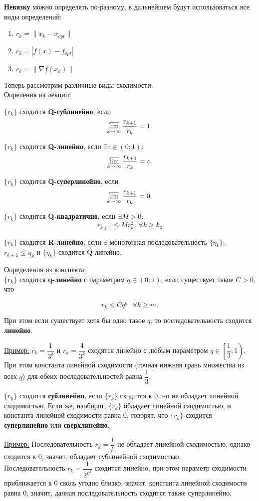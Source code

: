 \textbf{Невязку} можно определять по-разному, в дальнейшем будут использоваться все виды определений:
\begin{enumerate}
    \item $r_k = \|x_k - x_{opt}\|$
    \item $r_k = |f(x) - f_{opt}|$
    \item $r_k = \|\nabla f(x_k)\|$
\end{enumerate}
Теперь рассмотрим различные виды сходимости. \\
Опреления из лекции:

$\{r_k\}$ сходится \textbf{Q-сублинейно}, если \[\varlimsup\limits_{k\to\infty} \dfrac{r_{k+1}}{r_k} = 1.\]

$\{r_k\}$ сходится \textbf{Q-линейно}, если $\exists c\in(0; 1): $
\[\varlimsup\limits_{k\to\infty} \dfrac{r_{k+1}}{r_k} = c.\]

$\{r_k\}$ сходится \textbf{Q-суперлинейно}, если \[\varlimsup\limits_{k\to\infty} \dfrac{r_{k+1}}{r_k} = 0.\]


$\{r_k\}$ сходится \textbf{Q-квадратично}, если $\exists M>0:$ \[r_{k+1} \leq M r_k^2\ \ \ \forall k \geq k_0\]

$\{r_k\}$ сходится \textbf{R-линейно}, если $\exists$ монотонная последовательность $\{\eta_k\}$: $r_{k+1} \leq \eta_k$ и $\{\eta_k\}$ сходится Q-линейно.
\bigskip

Определения из конспекта:\\
$\{r_k\}$ сходится \textbf{q-линейно} с параметром $q\in (0; 1)$, если существует такое $C > 0$, что

\[r_k \leq Cq^k\ \ \ \forall k \geq m.\]

При этом если существует хотя бы одно такое $q$, то последовательность сходится \textbf{линейно}.

\underline{Пример:} $r_k = \dfrac{1}{3^k}$ и $r_k = \dfrac{4}{3^k}$ сходятся линейно с любым параметром $q \in \left[\dfrac{1}{3}; 1\right)$. При этом константа линейной сходимости (точная нижняя грань множества из всех $q$) для обеих последовательностей равна $\dfrac{1}{3}$.

$\{r_k\}$ сходится \textbf{сублинейно}, если $\{r_k\}$ сходится к 0, но не обладает линейной сходимостью. Если же, наоборот, $\{r_k\}$ обладает линейной сходимостью, и константа линейной сходимости равна 0, говорят, что $\{r_k\}$ сходится \textbf{суперлинейно} или \textbf{сверхлинейно}.

\underline{Пример:} Последовательность $r_k = \dfrac{1}{k}$ не обладает линейной сходимостью, однако сходится к 0, значит, обладает сублинейной сходимостью. \\
Последовательность $r_k = \dfrac{1}{3^{k^2}}$ сходится линейно, при этом параметр сходимости приближается к 0 сколь угодно близко, значит, константа линейной сходимости равна 0, значит, данная последовательность сходится также суперлинейно.

